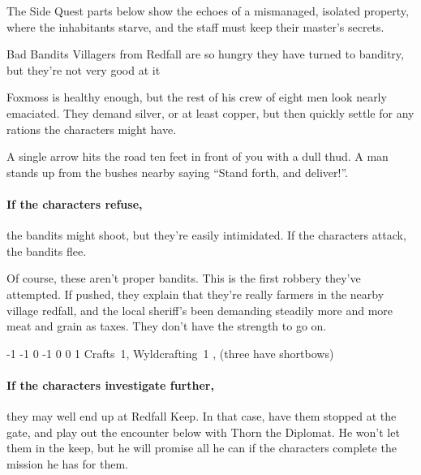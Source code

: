 The Side Quest parts below show the echoes of a mismanaged, isolated property, where the inhabitants starve, and the staff must keep their master's secrets.

{Bad Bandits}%
{Villagers from Redfall are so hungry they have turned to banditry, but they're not very good at it}%

Foxmoss is healthy enough, but the rest of his crew of eight men look nearly emaciated.
They demand silver, or at least copper, but then quickly settle for any rations the characters might have.

\begin{boxtext}

  A single arrow hits the road ten feet in front of you with a dull thud.
  A man stands up from the bushes nearby saying ``Stand forth, and deliver!''.

\end{boxtext}

\paragraph{If the characters refuse,}
the bandits might shoot, but they're easily intimidated.  If the characters attack, the bandits flee.

Of course, these aren't proper bandits.
This is the first robbery they've attempted.
If pushed, they explain that they're really farmers in the nearby village \gls{redfall}, and the local sheriff's been demanding steadily more and more meat and grain as taxes.
They don't have the strength to go on.


  {-1}%
  {-1}%
  {{0}%
  {-1}%
  {0}}%
  {0}%
  {1}%
  {Crafts~1, Wyldcrafting~1}%
  {\Dagger, (three have shortbows)}%
  {}

\paragraph{If the characters investigate further,}
they may well end up at Redfall Keep.
In that case, have them stopped at the gate, and play out the encounter below with Thorn the Diplomat.
He won't let them in the keep, but he will promise all he can if the characters complete the mission he has for them.


